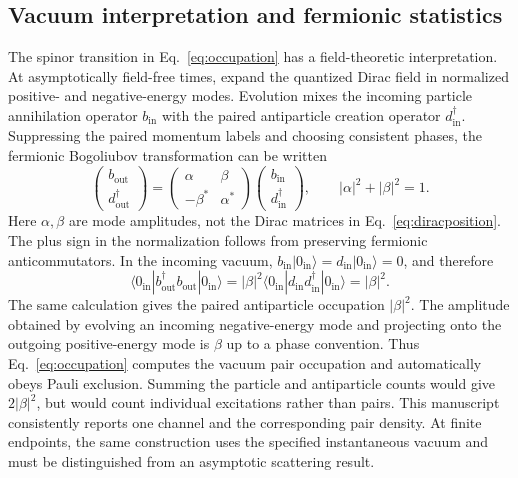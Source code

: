 \documentclass[11pt,a4paper]{article}
\begin{document}
\subsection{Vacuum interpretation and fermionic statistics}
The spinor transition in Eq.~\eqref{eq:occupation} has a field-theoretic interpretation. At asymptotically field-free times, expand the quantized Dirac field in normalized positive- and negative-energy modes. Evolution mixes the incoming particle annihilation operator $b_{\mathrm{in}}$ with the paired antiparticle creation operator $d_{\mathrm{in}}^\dagger$. Suppressing the paired momentum labels and choosing consistent phases, the fermionic Bogoliubov transformation \cite[Eqs.~(10)--(11)]{Schmidt1998} can be written
\begin{equation}
 \begin{pmatrix}b_{\mathrm{out}}\\d_{\mathrm{out}}^\dagger\end{pmatrix}
 =\begin{pmatrix}\alpha&\beta\\-\beta^*&\alpha^*\end{pmatrix}
 \begin{pmatrix}b_{\mathrm{in}}\\d_{\mathrm{in}}^\dagger\end{pmatrix},
 \qquad |\alpha|^2+|\beta|^2=1.
 \label{eq:bogoliubov}
\end{equation}
Here $\alpha,\beta$ are mode amplitudes, not the Dirac matrices in Eq.~\eqref{eq:diracposition}. The plus sign in the normalization follows from preserving fermionic anticommutators. In the incoming vacuum, $b_{\mathrm{in}}|0_{\mathrm{in}}\rangle=d_{\mathrm{in}}|0_{\mathrm{in}}\rangle=0$, and therefore
\begin{equation}
 \langle0_{\mathrm{in}}|b_{\mathrm{out}}^\dagger b_{\mathrm{out}}|0_{\mathrm{in}}\rangle
 =|\beta|^2\langle0_{\mathrm{in}}|d_{\mathrm{in}}d_{\mathrm{in}}^\dagger|0_{\mathrm{in}}\rangle
 =|\beta|^2.
\end{equation}
The same calculation gives the paired antiparticle occupation $|\beta|^2$. The amplitude obtained by evolving an incoming negative-energy mode and projecting onto the outgoing positive-energy mode is $\beta$ up to a phase convention. Thus Eq.~\eqref{eq:occupation} computes the vacuum pair occupation and automatically obeys Pauli exclusion. Summing the particle and antiparticle counts would give $2|\beta|^2$, but would count individual excitations rather than pairs. This manuscript consistently reports one channel and the corresponding pair density. At finite endpoints, the same construction uses the specified instantaneous vacuum and must be distinguished from an asymptotic scattering result.
\end{document}
